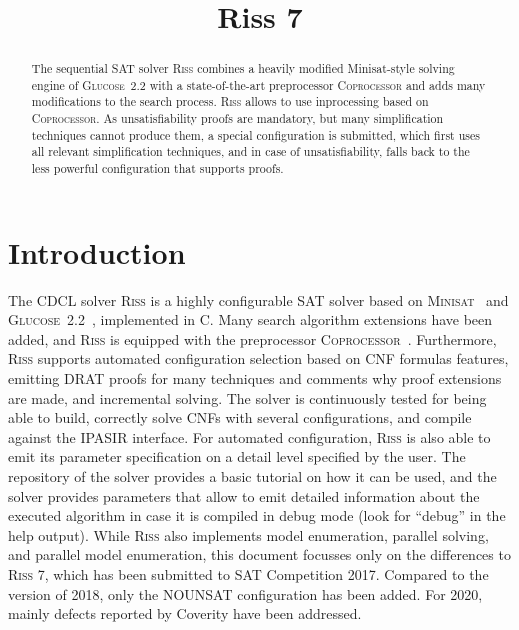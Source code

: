 \documentclass[conference]{IEEEtran}
\def\CC{{C\nolinebreak[4]\hspace{-.05em}\raisebox{.4ex}{\tiny\bf ++}}}
\begin{document}
	
\title{Riss 7}

\author{
}

\maketitle

\def\coprocessor{\textsc{Coprocessor}\xspace}
\def\glucose{\textsc{Glucose~2.2}\xspace}
\def\minisat{\textsc{Minisat~2.2}\xspace}
\def\riss{\textsc{Riss}\xspace}
\def\priss{\textsc{Priss}\xspace}

\begin{abstract}
The sequential SAT solver \riss combines a heavily modified Minisat-style solving engine of \glucose with a state-of-the-art preprocessor \textsc{Coprocessor} and adds many modifications to the search process. 
\riss allows to use inprocessing based on \coprocessor.
As unsatisfiability proofs are mandatory, but many simplification techniques cannot produce them, a special configuration is submitted, which first uses all relevant simplification techniques, and in case of unsatisfiability, falls back to the less powerful configuration that supports proofs.
\end{abstract}

\section{Introduction}

The CDCL solver \riss is a highly configurable SAT solver based on \textsc{Minisat}~\cite{EenS:2003} and \glucose ~\cite{AudemardS:2009,Audemard:2012:RRS:2405292.2405308}, implemented in \CC. 
Many search algorithm extensions have been added, and \riss is equipped with the preprocessor \textsc{Coprocessor}~\cite{Manthey:2012}. 
Furthermore, \riss supports automated configuration selection based on CNF formulas features, emitting DRAT proofs for many techniques and comments why proof extensions are made, and incremental solving.
The solver is continuously tested for being able to build, correctly solve CNFs with several configurations, and compile against the IPASIR interface.
For automated configuration, \riss is also able to emit its parameter specification on a detail level specified by the user.
The repository of the solver provides a basic tutorial on how it can be used, and the solver provides parameters that allow to emit detailed information about the executed algorithm in case it is compiled in debug mode (look for ``debug'' in the help output).
While \riss also implements model enumeration, parallel solving, and parallel model enumeration, this document focusses only on the differences to \textsc{Riss 7}, which has been submitted to SAT Competition 2017. 
Compared to the version of 2018, only the \textsc{NOUNSAT} configuration has been added.
For 2020, mainly defects reported by Coverity have been addressed.
\end{document}
